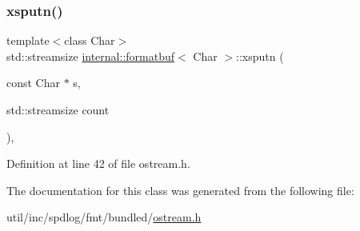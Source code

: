 \subsubsection{\texorpdfstring{xsputn()}{xsputn()}}
{\footnotesize\ttfamily template$<$class Char$>$ \\
std\+::streamsize \hyperlink{classinternal_1_1formatbuf}{internal\+::formatbuf}$<$ Char $>$\+::xsputn (\begin{DoxyParamCaption}\item[{const Char $\ast$}]{s,  }\item[{std\+::streamsize}]{count }\end{DoxyParamCaption})\hspace{0.3cm}{\ttfamily [inline]}, {\ttfamily [protected]}}



Definition at line 42 of file ostream.\+h.



The documentation for this class was generated from the following file\+:\begin{DoxyCompactItemize}
\item 
util/inc/spdlog/fmt/bundled/\hyperlink{ostream_8h}{ostream.\+h}\end{DoxyCompactItemize}
